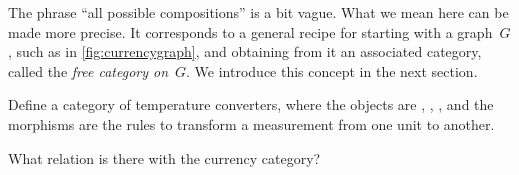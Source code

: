 The phrase ``all possible compositions'' is a bit vague. What we mean here can be made more precise. It corresponds to a general recipe for starting with a graph~$G$, such as in \cref{fig:currencygraph}, and obtaining from it an associated category, called the \emph{free category on}~$G$. We introduce this concept in the next section.


\begin{exercise}[Temperatures]
  Define a category of temperature converters, where the objects are
  , , , and the
  morphisms are the rules to transform a measurement from one unit to another.

  What relation is there with the currency category?

\end{exercise}


